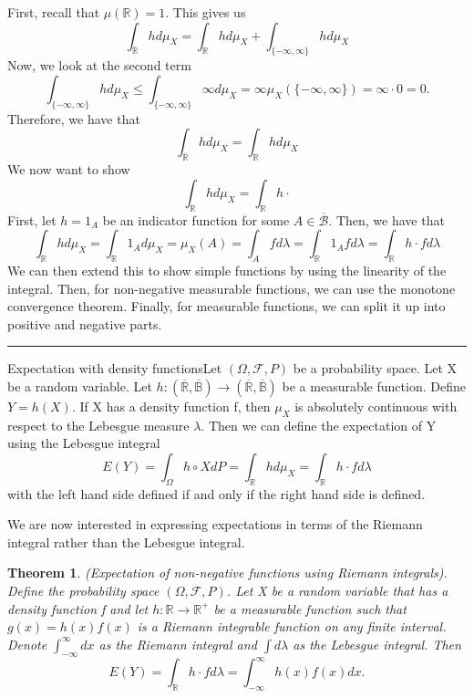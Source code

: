 \documentclass[twoside]{article}
\newcounter{lecnum}
\newtheorem{theorem}{Theorem}[lecnum]
\newenvironment{proof}{{\bf Proof:}}{\hfill\rule{2mm}{2mm}}
\newcommand{\sigmalgebra}{\mathcal{F}}
\newcommand{\borelsigmaalgebra}{\mathcal{B}}
\begin{document}
\begin{proof} First, recall that $\mu(\mathbb{R}) = 1.$ This gives us 
$$
\int_{\overline{\mathbb{R}}}hd\mu_X = \int_{\mathbb{R}}hd\mu_X + \int_{\{-\infty, \infty\}}hd\mu_X
$$
Now, we look at the second term 
$$
\int_{\{-\infty, \infty\}}hd\mu_X \leq \int_{\{-\infty, \infty\}}\infty d\mu_X = \infty\mu_X(\{-\infty, \infty\}) = \infty \cdot 0 = 0.
$$
Therefore, we have that 
$$
\int_{\overline{\mathbb{R}}}hd\mu_X = \int_{\mathbb{R}}hd\mu_X
$$
We now want to show 
$$
\int_{\mathbb{R}}hd\mu_X = \int_{\mathbb{R}}h\cdot 
$$
First, let $h = 1_A$ be an indicator function for some $A \in \overline{\borelsigmaalgebra}.$ Then, we have that 
$$
\int_{\mathbb{R}}hd\mu_X = \int_{\mathbb{R}}1_{A}d\mu_X = \mu_X(A) = \int_Afd\lambda = \int_{\mathbb{R}}1_Afd\lambda = \int_{\mathbb{R}}h\cdot fd\lambda 
$$
We can then extend this to show simple functions by using the linearity of the integral. Then, for non-negative measurable functions, we can use the monotone convergence theorem. Finally, for measurable functions, we can split it up into positive and negative parts.
\end{proof}

\begin{theorem_exam}{Expectation with density functions}{}Let $(\Omega, \sigmalgebra, P)$ be a probability space. Let X be a random variable. Let $h: (\overline{\mathbb{R}}, \overline{\mathbb{B}}) \rightarrow (\overline{\mathbb{R}}, \overline{\mathbb{B}})$ be a measurable function. Define $Y = h(X).$ If X has a density function f, then $\mu_X$ is absolutely continuous with respect to the Lebesgue measure $\lambda$. Then we can define the expectation of Y using the Lebesgue integral
$$
E(Y) = \int_{\Omega}h \circ XdP = \int_{\mathbb{R}}hd\mu_X = \int_{\mathbb{R}}h\cdot fd\lambda
$$
with the left hand side defined if and only if the right hand side is defined.
\end{theorem_exam}

We are now interested in expressing expectations in terms of the Riemann integral rather than the Lebesgue integral.

\begin{theorem}(Expectation of non-negative functions using Riemann integrals). Define the probability space $(\Omega, \sigmalgebra, P)$. Let X be a random variable that has a density function f and let $h: \mathbb{R} \rightarrow \mathbb{R}^+$ be a measurable function such that $g(x) = h(x)f(x)$ is a Riemann integrable function on any finite interval. Denote $\int_{-\infty}^{\infty}dx$ as the Riemann integral and $\int d\lambda$ as the Lebesgue integral. Then 
$$
E(Y) = \int_{\mathbb{R}}h\cdot fd\lambda = \int_{-\infty}^{\infty}h(x)f(x)dx.
$$
\end{theorem}
\end{document}
